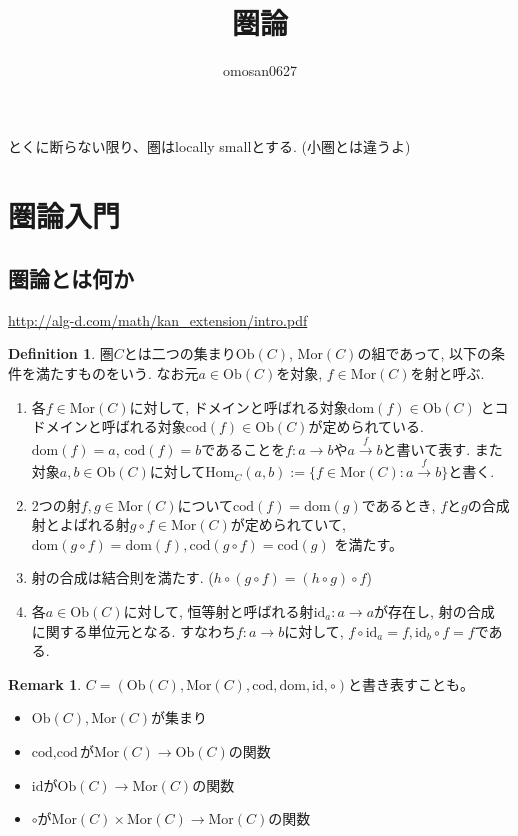 \documentclass[a4paper,10pt]{article}
\title{圏論}
\author{omosan0627}
\theoremstyle{definition}
\newtheorem{definition}[thm]{\bfseries Definition}
\newtheorem{remark}[thm]{\bfseries Remark}    %
\begin{document}
\maketitle

とくに断らない限り、圏はlocally smallとする. (小圏とは違うよ)
\section{圏論入門}
\subsection{圏論とは何か}
\url{http://alg-d.com/math/kan_extension/intro.pdf}
\begin{definition}
    圏$C$とは二つの集まり$\mathrm{Ob}(C)$, $\mathrm{Mor}(C)$の組であって, 以下の条件を満たすものをいう. 
    なお元$a \in \mathrm{Ob}(C)$を対象, $f \in \mathrm{Mor}(C)$を射と呼ぶ.
    \begin{enumerate}[(1)]
        \item 各$f \in \mathrm{Mor}(C)$に対して, ドメインと呼ばれる対象$\mathrm{dom}(f)\in \mathrm{Ob}(C)$
        とコドメインと呼ばれる対象$\mathrm{cod}(f) \in \mathrm{Ob}(C)$が定められている.
        $\mathrm{dom}(f) = a$, $\mathrm{cod}(f) = b$であることを$f:a \rightarrow b$や$a \xrightarrow{f} b$と書いて表す.
        また対象$a,b  \in \mathrm{Ob}(C)$に対して$\mathrm{Hom}_C(a,b):=\{f \in \mathrm{Mor}(C): a \xrightarrow{f} b\}$と書く.
        \item 2つの射$f,g \in \mathrm{Mor}(C)$について$\mathrm{cod}(f) = \mathrm{dom}(g)$であるとき, 
        $f$と$g$の合成射とよばれる射$g \circ f \in \mathrm{Mor}(C)$が定められていて, $\mathrm{dom}(g \circ f)=\mathrm{dom}(f), \mathrm{cod}(g \circ f)=\mathrm{cod}(g)$
        を満たす。
        \item 射の合成は結合則を満たす. ($h \circ (g \circ f) = (h \circ g) \circ f$)
        \item 各$a \in \mathrm{Ob}(C)$に対して, 恒等射と呼ばれる射$\mathrm{id}_{a}:a \rightarrow a$が存在し, 射の合成
        に関する単位元となる. すなわち$f:a \rightarrow b$に対して, $f \circ \mathrm{id}_a = f, \mathrm{id}_b \circ f = f$である.
    \end{enumerate}
\end{definition}
\begin{remark}
    $C = (\textrm{Ob}(C), \textrm{Mor}(C), \textrm{cod}, \textrm{dom}, \textrm{id}, \circ)$と書き表すことも。
    \begin{itemize}
     \item $\textrm{Ob}(C), \textrm{Mor}(C)$が集まり
     \item $\textrm{cod}, \textrm{cod}$が$\text{Mor}(C) \rightarrow \text{Ob}(C)$の関数
     \item $\textrm{id}$が$\textrm{Ob}(C) \rightarrow \textrm{Mor}(C)$の関数
     \item $\circ$が$\textrm{Mor}(C) \times \textrm{Mor}(C) \rightarrow \textrm{Mor}(C)$の関数
    \end{itemize}
\end{remark}
\end{document}
